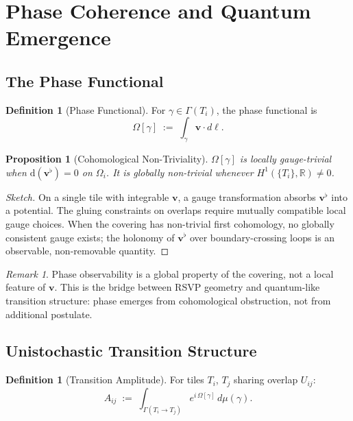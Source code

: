 \documentclass[11pt]{article}
\theoremstyle{plain}
\newtheorem{proposition}[theorem]{Proposition}
\theoremstyle{definition}
\newtheorem{definition}[theorem]{Definition}
\theoremstyle{remark}
\newtheorem{remark}[theorem]{Remark}
\newcommand{\vv}{\mathbf{v}}
\newcommand{\Hone}{H^1}
\begin{document}
\section{Phase Coherence and Quantum Emergence}

\subsection{The Phase Functional}

\begin{definition}[Phase Functional]
For $\gamma \in \Gamma(T_i)$, the phase functional is
\[
  \Omega[\gamma] \;:=\; \int_\gamma \vv \cdot d\ell.
\]
\end{definition}

\begin{proposition}[Cohomological Non-Triviality]
$\Omega[\gamma]$ is locally gauge-trivial when $\mathrm{d}(\vv^\flat) = 0$
on $\Omega_i$. It is globally non-trivial whenever
$\Hone(\{T_i\}, \mathbb{R}) \neq 0$.
\end{proposition}

\begin{proof}[Sketch]
On a single tile with integrable $\vv$, a gauge transformation absorbs
$\vv^\flat$ into a potential. The gluing constraints on overlaps require
mutually compatible local gauge choices. When the covering has non-trivial
first cohomology, no globally consistent gauge exists; the holonomy of
$\vv^\flat$ over boundary-crossing loops is an observable, non-removable
quantity.
\end{proof}

\begin{remark}
Phase observability is a global property of the covering, not a local
feature of $\vv$. This is the bridge between RSVP geometry and
quantum-like transition structure: phase emerges from cohomological
obstruction, not from additional postulate.
\end{remark}

\subsection{Unistochastic Transition Structure}

\begin{definition}[Transition Amplitude]
For tiles $T_i$, $T_j$ sharing overlap $U_{ij}$:
\[
  A_{ij} \;:=\; \int_{\Gamma(T_i \to T_j)} e^{i\,\Omega[\gamma]}
  \,d\mu(\gamma).
\]
\end{definition}
\end{document}
